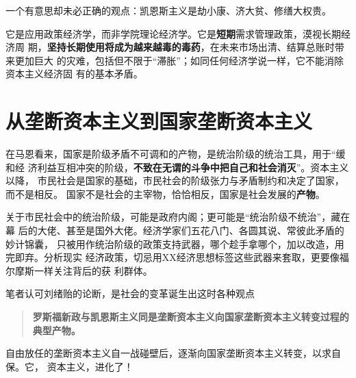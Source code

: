 一个有意思却未必正确的观点：凯恩斯主义是劫小康、济大贫、修缮大权贵。

它是应用政策经济学，而非学院理论经济学。它是\textbf{短期}需求管理政策，漠视长期经济周
期，\textbf{坚持长期使用将成为越来越毒的毒药}，在未来市场出清、结算总账时带来更加巨大
的灾难，包括但不限于“滞胀”；如同任何经济学说一样，它不能消除资本主义经济固
有的基本矛盾。

\section{从垄断资本主义到国家垄断资本主义}

在马恩看来，国家是阶级矛盾不可调和的产物，是统治阶级的统治工具，用于“缓和经
济利益互相冲突的阶级，\textbf{不致在无谓的斗争中把自己和社会消灭}”。资本主义以降，
市民社会是国家的基础，市民社会的阶级张力与矛盾制约和决定了国家，而不是相反。
国家不是社会的主宰物，恰恰相反，国家是社会发展的\textbf{产物}。

关于市民社会中的统治阶级，可能是政府内阁；更可能是“统治阶级不统治”，藏在幕
后的大佬、甚至是国外大佬。经济学家们五花八门、各圆其说、常彼此矛盾的妙计锦囊，
只被用作统治阶级的政策支持武器，哪个趁手拿哪个，加以改造，用完即弃。分析现实
经济政策，切忌用XX经济思想标签这些武器来套取，更要像福尔摩斯一样关注背后的获
利群体。

笔者认可刘绪贻的论断，是社会的变革诞生出这时各种观点
\begin{quotation}
  \textbf{罗斯福新政与凯恩斯主义同是垄断资本主义向国家垄断资本主义转变过程的典型产物。}
\end{quotation}


自由放任的垄断资本主义自一战碰壁后，逐渐向国家垄断资本主义转变，以求自保。它，
资本主义，进化了！





